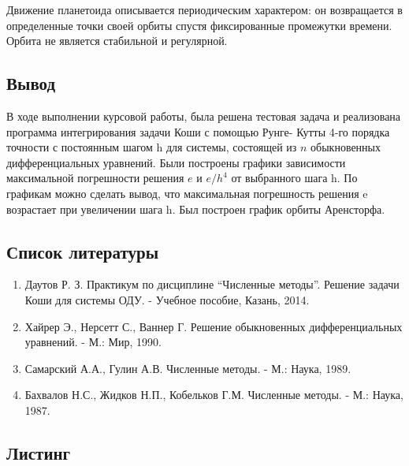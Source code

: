 \documentclass[a4paper,12pt]{article}
\begin{document}
{Движение планетоида описывается периодическим характером: он возвращается в определенные точки своей орбиты спустя фиксированные промежутки времени.
Орбита не является стабильной и регулярной.
\clearpage
\begin{center}
	\section*{Вывод}
\end{center}
\par В ходе выполнении курсовой работы, была решена тестовая задача и реализована программа интегрирования задачи Коши с 
помощью Рунге- Кутты 4-го порядка точности с постоянным шагом h для системы, состоящей из $n$ обыкновенных дифференциальных уравнений. Были построены графики зависимости максимальной 
погрешности решения $e$ и $e/h^4$ от выбранного шага h. По графикам можно сделать вывод, что максимальная погрешность
решения e возрастает при увеличении шага h. Был построен график орбиты Аренсторфа.
\newpage
\begin{center}
	\section*{Список литературы}
\end{center}
\begin{enumerate}
	\item Даутов Р. З. Практикум по дисциплине “Численные методы”. Решение задачи Коши для системы ОДУ. - Учебное пособие, Казань, 2014.
	\item Хайрер Э., Нерсетт С., Ваннер Г. Решение обыкновенных дифференциальных уравнений. - М.: Мир, 1990.
	\item Самарский А.А., Гулин А.В. Численные методы. - М.: Наука, 1989.
	\item Бахвалов Н.С., Жидков Н.П., Кобельков Г.М. Численные методы. - М.: Наука, 1987.
  \end{enumerate}

\newpage
}
\begin{center}
	\section*{Листинг}
\end{center}



\end{document}
